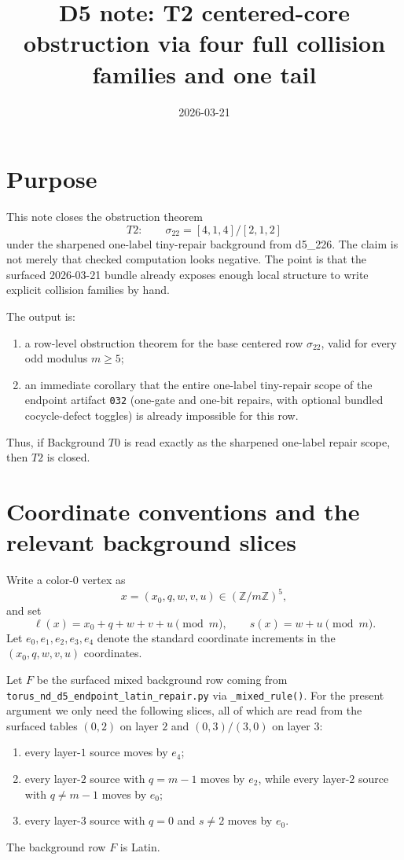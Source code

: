 \documentclass[11pt]{article}
\title{D5 note: T2 centered-core obstruction via four full collision families and one tail}
\author{}
\date{2026-03-21}
\newcommand{\eX}{e_0}
\newcommand{\eQ}{e_1}
\newcommand{\eW}{e_2}
\newcommand{\eV}{e_3}
\newcommand{\eU}{e_4}
\begin{document}
\maketitle

\section*{Purpose}

This note closes the obstruction theorem
\[
T2:\qquad \sigma_{22}=[4,1,4]/[2,1,2]
\]
under the sharpened one-label tiny-repair background from d5\_226.
The claim is not merely that checked computation looks negative.
The point is that the surfaced 2026-03-21 bundle already exposes enough local
structure to write explicit collision families by hand.

The output is:
\begin{enumerate}
\item a row-level obstruction theorem for the base centered row $\sigma_{22}$,
      valid for every odd modulus $m\ge 5$;
\item an immediate corollary that the entire one-label tiny-repair scope of the
      endpoint artifact \texttt{032} (one-gate and one-bit repairs, with optional
      bundled cocycle-defect toggles) is already impossible for this row.
\end{enumerate}

Thus, if Background $T0$ is read exactly as the sharpened one-label repair scope,
then $T2$ is closed.

\section*{Coordinate conventions and the relevant background slices}

Write a color-$0$ vertex as
\[
x=(x_0,q,w,v,u)\in (\mathbb Z/m\mathbb Z)^5,
\]
and set
\[
\ell(x)=x_0+q+w+v+u \pmod m,
\qquad
s(x)=w+u \pmod m.
\]
Let $\eX,\eQ,\eW,\eV,\eU$ denote the standard coordinate increments in the
$(x_0,q,w,v,u)$ coordinates.

Let $F$ be the surfaced mixed background row coming from
\texttt{torus\_nd\_d5\_endpoint\_latin\_repair.py} via \texttt{\_mixed\_rule()}.
For the present argument we only need the following slices, all of which are read
from the surfaced tables $(0,2)$ on layer $2$ and $(0,3)/(3,0)$ on layer $3$:
\begin{enumerate}
\item every layer-$1$ source moves by $\eU$;
\item every layer-$2$ source with $q=m-1$ moves by $\eW$, while every layer-$2$
      source with $q\neq m-1$ moves by $\eX$;
\item every layer-$3$ source with $q=0$ and $s\neq 2$ moves by $\eX$.
\end{enumerate}
The background row $F$ is Latin.
\end{document}
